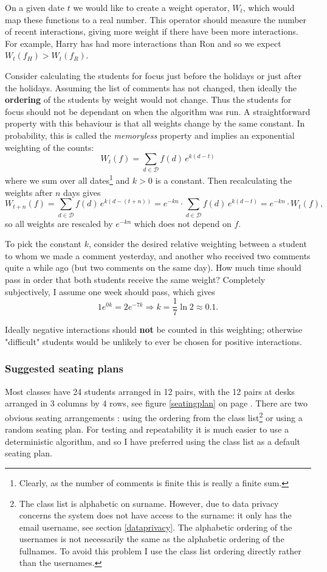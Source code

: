 \documentclass[10pt]{article}
\begin{document}
On a given date $t$ we would like to create a weight operator, $W_t$, which would map these functions to a real number. This operator should measure the number of recent interactions, giving more weight if there have been more interactions. For example, Harry has had more interactions than Ron and so we expect $W_t(f_H) > W_t(f_R)$.

Consider calculating the students for focus just before the holidays or just after the holidays. Assuming the list of comments has not changed, then ideally the \textbf{ordering} of the students by weight would not change. Thus the students for focus should not be dependant on when the algorithm was run. A straightforward property with this behaviour is that all weights change by the same constant. In probability, this is called the \emph{memoryless} property \cite{Norr98} and implies an exponential weighting of the counts:
$$ W_t(f) = \sum_{d \in \mathcal{D}} f(d) \, e^{k(d-t)} $$
where we sum over all dates\footnote{Clearly, as the number of comments is finite this is really a finite sum.}  and $k>0$ is a constant. Then recalculating the weights after $n$ days gives
$$W_{t+n}(f) = \sum_{d \in \mathcal{D}} f(d) \, e^{k(d-(t+n))} =  e^{-kn} \cdot \sum_{d \in \mathcal{D}} f(d) \, e^{k(d-t)} = e^{-kn} \cdot  W_t(f),$$
so all weights are rescaled by $e^{-kn}$ which does not depend on $f$.

To pick the constant $k$, consider the desired relative weighting between a student to whom we made a comment yesterday, and another who received two comments quite a while ago (but two comments on the same day). How much time should pass in order that both students receive the same weight? Completely subjectively, I assume one week should pass, which gives
$$1 e^{0k} = 2 e^{-7k} \Rightarrow k = \frac{1}{7} \ln {2}  \approx 0.1.$$ 

Ideally negative interactions should \textbf{not} be counted in this weighting; otherwise "difficult" students would be unlikely to ever be chosen for positive interactions.

\subsubsection{Suggested seating plans}

Most classes have 24 students arranged in 12 pairs, with the 12 pairs at desks arranged in 3 columns by 4 rows, see figure \ref{seatingplan} on page \pageref{seatingplan}. There are two obvious seating arrangements : using the ordering from the class list\footnote{The class list is alphabetic on surname. However, due to data privacy concerns the system does not have access to the surname: it only has the email username, see section \ref{dataprivacy}. The alphabetic ordering of the usernames is not necessarily the same as the alphabetic ordering of the fullnames. To avoid this problem I use the class list ordering directly rather than the usernames.} or using a random seating plan. For testing and repeatability it is much easier to use a deterministic algorithm, and so I have preferred using the class list as a default seating plan.
\end{document}
